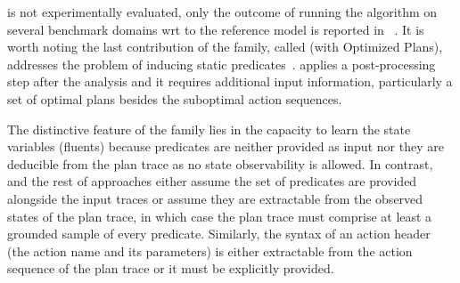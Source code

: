 \LOCMtwo is not experimentally evaluated, only the outcome of running the \LOCMtwo algorithm on several benchmark domains wrt to the reference model is reported in ~\cite{cresswell2011generalised}. It is worth noting the last contribution of the \LOCM family, called \textbf{\LOP} (\LOCM with Optimized Plans), addresses the problem of inducing static predicates~\cite{GregoryC16}. \LOP applies a post-processing step after the \LOCM analysis and it requires additional input information, particularly a set of optimal plans besides the suboptimal \FO action sequences.

The distinctive feature of the \LOCM family lies in the capacity to learn the state variables (fluents) because predicates are neither provided as input nor they are deducible from the plan trace as no state observability is allowed. In contrast, \FAMA and the rest of approaches either assume the set of predicates are provided alongside the input traces or assume they are extractable from the observed states of the plan trace, in which case the plan trace must comprise at least a grounded sample of every predicate. Similarly, the syntax of an action header (the action name and its parameters) is either extractable from the action sequence of the plan trace or it must be explicitly provided.







